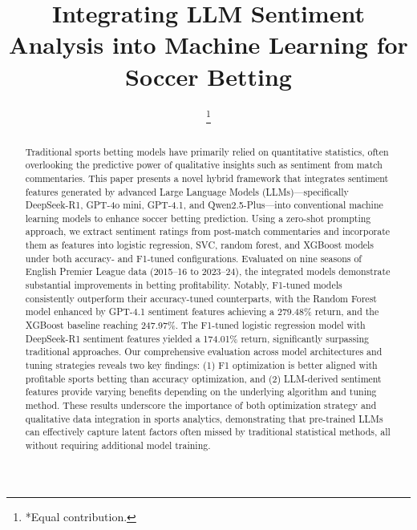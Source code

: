 \documentclass[conference]{IEEEtran}
\begin{document}
\title{%
%
Integrating LLM Sentiment Analysis into Machine Learning for Soccer Betting\\
}

\author{
\thanks{*Equal contribution.}
}
\maketitle

\begin{abstract}
Traditional sports betting models have primarily relied on quantitative statistics, often overlooking the predictive power of qualitative insights such as sentiment from match commentaries. This paper presents a novel hybrid framework that integrates sentiment features generated by advanced Large Language Models (LLMs)—specifically DeepSeek-R1, GPT-4o mini, GPT-4.1, and Qwen2.5-Plus—into conventional machine learning models to enhance soccer betting prediction.
Using a zero-shot prompting approach, we extract sentiment ratings from post-match commentaries and incorporate them as features into logistic regression, SVC, random forest, and XGBoost models under both accuracy- and F1-tuned configurations. Evaluated on nine seasons of English Premier League data (2015–16 to 2023–24), the integrated models demonstrate substantial improvements in betting profitability.
Notably, F1-tuned models consistently outperform their accuracy-tuned counterparts, with the Random Forest model enhanced by GPT-4.1 sentiment features achieving a 279.48\% return, and the XGBoost baseline reaching 247.97\%. The F1-tuned logistic regression model with DeepSeek-R1 sentiment features yielded a 174.01\% return, significantly surpassing traditional approaches.
Our comprehensive evaluation across model architectures and tuning strategies reveals two key findings: (1) F1 optimization is better aligned with profitable sports betting than accuracy optimization, and (2) LLM-derived sentiment features provide varying benefits depending on the underlying algorithm and tuning method. These results underscore the importance of both optimization strategy and qualitative data integration in sports analytics, demonstrating that pre-trained LLMs can effectively capture latent factors often missed by traditional statistical methods, all without requiring additional model training.
\end{abstract}
\end{document}
